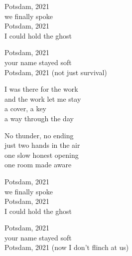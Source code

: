 \begin{lyrics}
Potsdam, 2021\\
we finally spoke\\
Potsdam, 2021\\
I could hold the ghost

Potsdam, 2021\\
your name stayed soft\\
Potsdam, 2021
(not just survival)

I was there for the work\\
and the work let me stay\\
a cover, a key\\
a way through the day

No thunder, no ending\\
just two hands in the air\\
one slow honest opening\\
one room made aware

Potsdam, 2021\\
we finally spoke\\
Potsdam, 2021\\
I could hold the ghost

Potsdam, 2021\\
your name stayed soft\\
Potsdam, 2021
(now I don’t flinch at us)
\end{lyrics}

